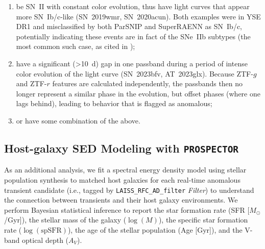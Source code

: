 \documentclass[twocolumn]{aastex63}
\begin{document}
\begin{enumerate}
    \item be SN~II with constant color evolution, thus have light curves that appear more SN~Ib/c-like (SN~2019wmr, SN~2020acun). Both examples were in YSE DR1 and misclassified by both ParSNIP and SuperRAENN as SN~Ib/c, potentially indicating these events are in fact of the SNe~IIb subtypes (the most common such case, as cited in \citealt{Aleo2023});
    \item have a significant (\textgreater10~d) gap in one passband during a period of intense color evolution of the light curve (SN~2023bfv, AT~2023glx). Because ZTF-$g$ and ZTF-$r$ features are calculated independently, the passbands then no longer represent a similar phase in the evolution, but offset phases (where one lags behind), leading to behavior that is flagged as anomalous;
    \item or have some combination of the above.
\end{enumerate}


\subsection{Host-galaxy SED Modeling with \texttt{PROSPECTOR}} 
\label{subsec:fit-prospector}

As an additional analysis, we fit a spectral energy density model using stellar population synthesis to matched host galaxies for each real-time anomalous transient candidate (i.e., tagged by \texttt{LAISS\_RFC\_AD\_filter} \textit{Filter}) to understand the connection between transients and their host galaxy environments. We perform Bayesian statistical inference to report the star formation rate (SFR [$M_{\odot}$/Gyr]), the stellar mass of the galaxy ($\log(M)$), the specific star formation rate ($\log(\text{spSFR})$), the age of the stellar population (Age [Gyr]), and the V-band optical depth ($A_V$). \par
\end{document}
